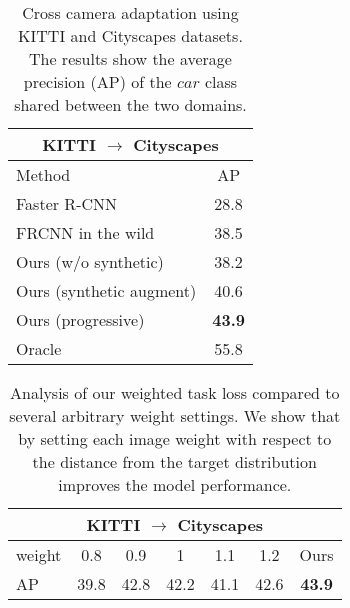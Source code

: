 \documentclass[10pt,twocolumn,letterpaper]{article}
\begin{document}
\begingroup
\renewcommand{\arraystretch}{1}
\begin{table}
\begin{center}
\caption{
Cross camera adaptation using KITTI and Cityscapes datasets.
The results show the average precision (AP) of the $car$ class shared between the two domains.
}
\vspace{3mm}
\label{tab:K_C}
\begin{tabular}{lc}
				\toprule
                \multicolumn{2}{c}{KITTI $\rightarrow$ Cityscapes} \\
				\midrule
                Method  & AP \\
                \midrule
                Faster R-CNN &  28.8\\
                \midrule
                FRCNN in the wild \cite{chen2018domain} & 38.5\\
                Ours (w/o synthetic)        & 38.2 \\
                Ours (synthetic augment) & 40.6\\
                Ours (progressive) & \textbf{43.9}  \\
			   \midrule
			   Oracle & 55.8 \\
			   \bottomrule
\end{tabular}
\vspace{-3mm}
\end{center}
\end{table}
\endgroup

\begingroup
\renewcommand{\arraystretch}{0.75}
\begin{table}
\begin{center}
\caption{
Analysis of our weighted task loss compared to several arbitrary weight settings.
We show that by setting each image weight with respect to the distance from the target distribution improves the model performance.
}
\vspace{3mm}
\label{tab:weight}
\begin{tabular}{lcccccc}
				\toprule
                \multicolumn{7}{c}{KITTI $\rightarrow$ Cityscapes} \\
				\midrule
				weight & 0.8& 0.9& 1& 1.1& 1.2 & Ours\\
			   \midrule
			   AP & 39.8& 42.8& 42.2& 41.1& 42.6& \textbf{43.9}\\
			   \bottomrule
\end{tabular}
\vspace{-7mm}
\end{center}
\end{table}
\endgroup
\end{document}
